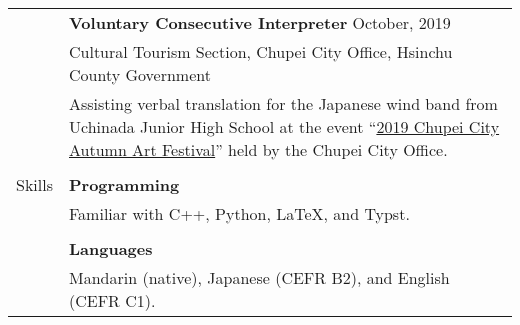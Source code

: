 \documentclass[letterpaper, 11pt]{article}
\begin{document}
\begin{center}
\begin{longtable}{p{0.76in}p{5.93in}}
        & \textbf{Voluntary Consecutive Interpreter} \hfill October, 2019\\
        & Cultural Tourism Section, Chupei City Office, Hsinchu County Government\\
        & Assisting verbal translation for the Japanese wind band from Uchinada Junior High School at the event ``\href{https://www.zhubei.gov.tw/travel/p2_1_2.php?bigact_id=111}{2019 Chupei City Autumn Art Festival}'' held by the Chupei City Office.\\
        & \\
        
        
        {\textcolor{OliveGreen}{Skills}} 
        & \textbf{Programming}\\
        & Familiar with C++, Python, \LaTeX, and Typst. \\
        & \\
        
        & \textbf{Languages} \\
        & Mandarin (native), Japanese (CEFR B2), and English (CEFR C1). \\
        
        
    \end{longtable}
\end{center}
\end{document}
